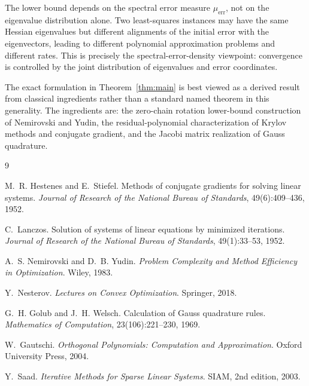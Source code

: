 \documentclass[11pt]{article}
\theoremstyle{definition}
\begin{document}
The lower bound depends on the spectral error measure
\(\mu_{\mathrm{err}}\), not on the eigenvalue distribution alone.  Two
least-squares instances may have the same Hessian eigenvalues but different
alignments of the initial error with the eigenvectors, leading to different
polynomial approximation problems and different rates.  This is precisely the
spectral-error-density viewpoint: convergence is controlled by the joint
distribution of eigenvalues and error coordinates.

The exact formulation in Theorem~\ref{thm:main} is best viewed as a derived result
from classical ingredients rather than a standard named theorem in this
generality.  The ingredients are: the zero-chain rotation lower-bound
construction of Nemirovski and Yudin, the residual-polynomial
characterization of Krylov methods and conjugate gradient, and the Jacobi
matrix realization of Gauss quadrature.

\begin{thebibliography}{9}

M.~R. Hestenes and E.~Stiefel.
\newblock Methods of conjugate gradients for solving linear systems.
\newblock \emph{Journal of Research of the National Bureau of Standards},
49(6):409--436, 1952.

C.~Lanczos.
\newblock Solution of systems of linear equations by minimized iterations.
\newblock \emph{Journal of Research of the National Bureau of Standards},
49(1):33--53, 1952.

A.~S. Nemirovski and D.~B. Yudin.
\newblock \emph{Problem Complexity and Method Efficiency in Optimization}.
\newblock Wiley, 1983.

Y.~Nesterov.
\newblock \emph{Lectures on Convex Optimization}.
\newblock Springer, 2018.

G.~H. Golub and J.~H. Welsch.
\newblock Calculation of Gauss quadrature rules.
\newblock \emph{Mathematics of Computation}, 23(106):221--230, 1969.

W.~Gautschi.
\newblock \emph{Orthogonal Polynomials: Computation and Approximation}.
\newblock Oxford University Press, 2004.

Y.~Saad.
\newblock \emph{Iterative Methods for Sparse Linear Systems}.
\newblock SIAM, 2nd edition, 2003.

\end{thebibliography}
\end{document}
